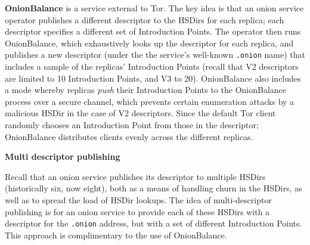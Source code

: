 \begin{widelist}
\item \textbf{OnionBalance}
is a service external to Tor.  The key idea is that an onion service operator
publishes a different descriptor to the HSDirs for each replica; each
descriptor specifies a different set of Introduction Points.
% 
The operator then runs OnionBalance, which exhaustively looks up the descriptor
for each replica, and publishes a new descriptor (under the the service's
well-known \texttt{.onion} name) that includes a sample of the replicas'
Introduction Points (recall that V2 descriptors are limited to 10
Introduction Points, and V3 to 20).
%
OnionBalance also includes a mode whereby replicas \emph{push} their
Introduction Points to the OnionBalance process over a secure channel,
which prevents certain enumeration attacks by a malicious HSDir in the case
of V2 descriptors.
%
Since the default Tor client randomly chooses an Introduction Point from those
in the descriptor; OnionBalance distributes clients evenly across the
different replicas.



\item \textbf{Multi descriptor publishing}

Recall that an onion service publishes its descriptor to multiple HSDirs
(historically six, now eight), both as a means of handling churn in the HSDirs,
as well as to spread the load of HSDir lookups.
%
The idea of multi-descriptor publishing is for an onion service to provide
each of these HSDirs with a descriptor for the \texttt{.onion} address, but
with a set of different Introduction Points.
%
This approach is complimentary to the use of OnionBalance.
\end{widelist}



